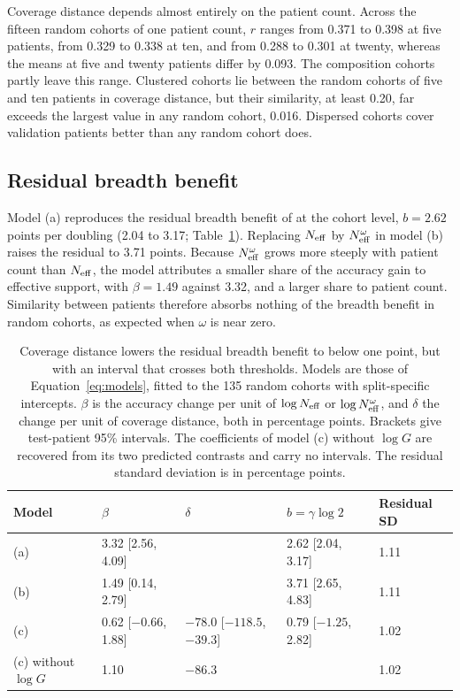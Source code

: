 Coverage distance depends almost entirely on the patient count. Across the fifteen random cohorts of one patient count, $r$ ranges from 0.371 to 0.398 at five patients, from 0.329 to 0.338 at ten, and from 0.288 to 0.301 at twenty, whereas the means at five and twenty patients differ by 0.093. The composition cohorts partly leave this range. Clustered cohorts lie between the random cohorts of five and ten patients in coverage distance, but their similarity, at least 0.20, far exceeds the largest value in any random cohort, 0.016. Dispersed cohorts cover validation patients better than any random cohort does.

\subsection{Residual breadth benefit}
\label{sec:residual-results}
Model (a) reproduces the residual breadth benefit of \citet{queisler2026multidirectionalRedundancy} at the cohort level, $b=2.62$ points per doubling (2.04 to 3.17; Table~\ref{tab:models}). Replacing $N_{\mathrm{eff}}$ by $N_{\mathrm{eff}}^{\omega}$ in model (b) raises the residual to 3.71 points. Because $N_{\mathrm{eff}}^{\omega}$ grows more steeply with patient count than $N_{\mathrm{eff}}$, the model attributes a smaller share of the accuracy gain to effective support, with $\beta=1.49$ against 3.32, and a larger share to patient count. Similarity between patients therefore absorbs nothing of the breadth benefit in random cohorts, as expected when $\omega$ is near zero.

\begin{table}[htbp]
\centering
\small
\renewcommand{\arraystretch}{1.15}
\begin{tabular}{@{}lllll@{}}
\toprule
Model & $\beta$ & $\delta$ & $b=\gamma\log 2$ & Residual SD \\
\midrule
(a) & 3.32 [2.56, 4.09] & & 2.62 [2.04, 3.17] & 1.11 \\
(b) & 1.49 [0.14, 2.79] & & 3.71 [2.65, 4.83] & 1.11 \\
(c) & 0.62 [$-0.66$, 1.88] & $-78.0$ [$-118.5$, $-39.3$] & 0.79 [$-1.25$, 2.82] & 1.02 \\
(c) without $\log G$ & 1.10 & $-86.3$ & & 1.02 \\
\bottomrule
\end{tabular}
\caption{Coverage distance lowers the residual breadth benefit to below one point, but with an interval that crosses both thresholds. Models are those of Equation~\eqref{eq:models}, fitted to the 135 random cohorts with split-specific intercepts. $\beta$ is the accuracy change per unit of $\log N_{\mathrm{eff}}$ or $\log N_{\mathrm{eff}}^{\omega}$, and $\delta$ the change per unit of coverage distance, both in percentage points. Brackets give test-patient 95\% intervals. The coefficients of model (c) without $\log G$ are recovered from its two predicted contrasts and carry no intervals. The residual standard deviation is in percentage points.}
\label{tab:models}
\end{table}

